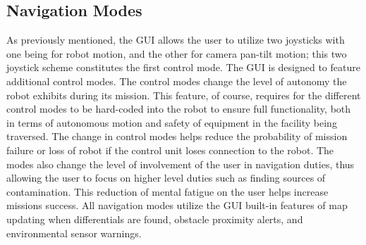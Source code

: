 
\subsection{Navigation Modes}

As previously mentioned, the GUI allows the user to utilize two joysticks with one being for robot motion, and the other for camera pan-tilt motion; this two joystick scheme constitutes the first control mode. The GUI is designed to feature additional control modes. The control modes change the level of autonomy the robot exhibits during its mission. This feature, of course, requires for the different control modes to be hard-coded into the robot to ensure full functionality, both in terms of autonomous motion and safety of equipment in the facility being traversed. The change in control modes helps reduce the probability of mission failure or loss of robot if the control unit loses connection to the robot. The modes also change the level of involvement of the user in navigation duties, thus allowing the user to focus on higher level duties such as finding sources of contamination. This reduction of mental fatigue on the user helps increase missions success. All navigation modes utilize the GUI built-in features of map updating when differentials are found, obstacle proximity alerts, and environmental sensor warnings. 

